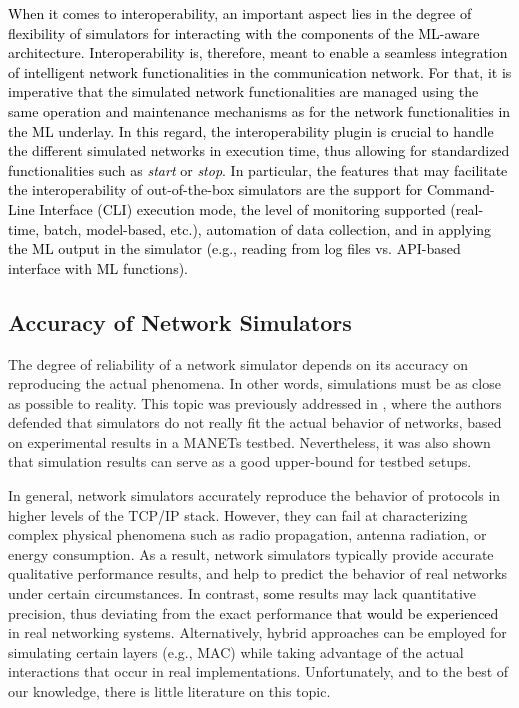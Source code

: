 \documentclass[journal]{IEEEtran}
\begin{document}
    \textcolor{black}{When it comes to interoperability, an important aspect lies in the degree of flexibility of simulators for interacting with the components of the ML-aware architecture. Interoperability is, therefore, meant to enable a seamless integration of intelligent network functionalities in the communication network. For that, it is imperative that the simulated network functionalities are managed using the same operation and maintenance mechanisms as for the network functionalities in the ML underlay. In this regard, the interoperability plugin is crucial to handle the different simulated networks in execution time, thus allowing for standardized functionalities such as \textit{start} or \textit{stop}. In particular, the features that may facilitate the interoperability of out-of-the-box simulators are the support for Command-Line Interface (CLI) execution mode, the level of monitoring supported (real-time, batch, model-based, etc.), automation of data collection, and in applying the ML output in the simulator (e.g., reading from log files vs. API-based interface with ML functions).}
   
	\subsection{Accuracy of Network Simulators}
	The degree of reliability of a network simulator depends on its accuracy on reproducing the actual phenomena. In other words, simulations must be as close as possible to reality. This topic was previously addressed in \cite{accuracy_manet}, where the authors defended that simulators do not really fit the actual behavior of networks, based on experimental results in a MANETs testbed. Nevertheless, it was also shown that simulation results can serve as a good upper-bound for testbed setups.
		
	In general, network simulators accurately reproduce the behavior of protocols in higher levels of the TCP/IP stack. However, they can fail at characterizing complex physical phenomena such as radio propagation, antenna radiation, or energy consumption. As a result, network simulators typically provide accurate qualitative performance results, and help to predict the behavior of real networks under certain circumstances. In contrast, \textcolor{black}{some} results may lack quantitative precision, thus deviating from the exact performance \textcolor{black}{that would be experienced} in real networking systems. Alternatively, hybrid approaches can be employed for simulating certain layers (e.g., MAC) while taking advantage of the actual interactions that occur in real implementations. Unfortunately, and to the best of our knowledge, there is little literature on this topic. 
		
\end{document}
